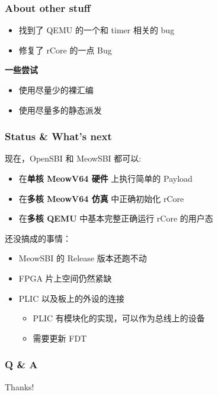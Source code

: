 \documentclass[UTF-8]{ctexbeamer}
\begin{document}
\begin{frame}
  \frametitle{About other stuff}

  \begin{itemize}
    \item 找到了 QEMU 的一个和 timer 相关的 bug
    \item 修复了 rCore 的一点 Bug
  \end{itemize}

  \pause

  \vspace{1em}
  \textbf{一些尝试}
  \begin{itemize}
    \item 使用尽量少的裸汇编
    \item 使用尽量多的静态派发
  \end{itemize}
\end{frame}

\begin{frame}
  \frametitle{Status \& What's next}

  现在，OpenSBI 和 MeowSBI 都可以:
  \begin{itemize}
    \item 在\textbf{单核 MeowV64 硬件} 上执行简单的 Payload
    \item 在\textbf{多核 MeowV64 仿真} 中正确初始化 rCore
    \item 在\textbf{多核 QEMU} 中基本完整正确运行 rCore 的用户态
  \end{itemize}

  \pause
  \vspace{1em}

  还没搞成的事情：
  \begin{itemize}
    \item MeowSBI 的 Release 版本还跑不动
    \item FPGA 片上空间仍然紧缺
    \item PLIC 以及板上的外设的连接
    \begin{itemize}
      \item PLIC 有模块化的实现，可以作为总线上的设备
      \item 需要更新 FDT
    \end{itemize}
  \end{itemize}
\end{frame}

\begin{frame}
  \frametitle{Q \& A}

  Thanks!
\end{frame}
\end{document}
